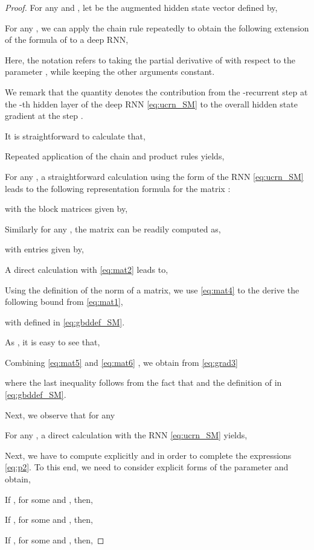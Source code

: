 \documentclass[a4paper]{article}
\begin{document}
\begin{proof}
For any  and , let  be the augmented hidden state vector defined by,

For any , we can apply the chain rule repeatedly to obtain the following extension of the formula of \cite{vanish_grad} to a deep RNN,

Here, the notation  refers to taking the partial derivative of  with respect to the parameter , while keeping the other arguments constant. 

We remark that the quantity  denotes the contribution from the -recurrent step at the -th hidden layer of the deep RNN \eqref{eq:ucrn_SM} to the overall hidden state gradient at the step . 

It is straightforward to calculate that,


Repeated application of the chain and product rules yields,

For any , a straightforward calculation using the form of the RNN \eqref{eq:ucrn_SM} leads to the following representation formula for the matrix :

with the block matrices  given by,

Similarly for any , the matrix   can be readily computed as,

with entries given by,

A direct calculation with \eqref{eq:mat2} leads to,

Using the definition of the  norm of a matrix, we use \eqref{eq:mat4} to the derive the following bound from \eqref{eq:mat1},

with 
 defined in \eqref{eq:gbddef_SM}.

As , it is easy to see that,

Combining \eqref{eq:mat5} and \eqref{eq:mat6} , we obtain from \eqref{eq:grad3}

where the last inequality follows from the fact that  and the definition of  in \eqref{eq:gbddef_SM}.

Next, we observe that for any 

For any , a direct calculation with the RNN \eqref{eq:ucrn_SM} yields,

Next, we have to compute explicitly  and  in order to complete the expressions \eqref{eq:p2}. To this end, we need to consider explicit forms of the parameter  and obtain, 

If , for some  and , then,


If , for some  and , then,


If , for some  and , then,


\end{proof}
\end{document}
